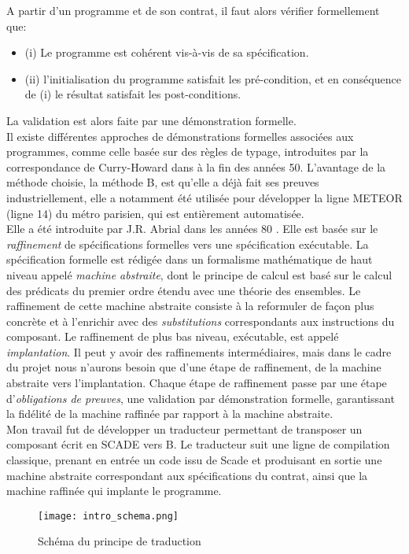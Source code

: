 \noindent
A partir d'un programme et de son contrat, il faut alors vérifier formellement
que: 
\begin{itemize}
\item  (i) Le programme est cohérent vis-à-vis de sa spécification.
\item (ii) l'initialisation du programme satisfait les pré-condition, et en
conséquence de (i) le résultat satisfait les post-conditions.
\end{itemize}
La validation est alors faite par une démonstration formelle.\\

Il existe différentes approches de démonstrations formelles associées aux programmes, comme celle basée
sur des règles de typage, introduites par la correspondance de
Curry-Howard dans à la fin des années 50. 
L'avantage de la méthode choisie, la méthode B, est qu'elle a déjà
fait ses preuves industriellement, elle a notamment été utilisée pour
développer la ligne METEOR (ligne 14) du métro parisien, qui est
entièrement automatisée.\\ 
Elle a été introduite
par J.R. Abrial dans les années 80 \cite{JRA}. Elle est basée sur le \emph{raffinement} de
spécifications formelles vers une spécification exécutable. La spécification
formelle est rédigée dans un formalisme mathématique de haut niveau appelé
\emph{machine abstraite}, dont le principe de calcul est basé sur le calcul
des prédicats du premier ordre étendu avec une théorie des
ensembles. Le raffinement de cette machine abstraite consiste à la
reformuler de façon plus concrète et à l'enrichir avec des
\emph{substitutions} correspondants aux instructions du composant. Le
raffinement de plus bas niveau, exécutable, est appelé \emph{implantation}. Il peut y
avoir des raffinements intermédiaires, mais dans le cadre du projet nous n'aurons besoin que
d'une étape de raffinement, de la machine abstraite vers l'implantation. Chaque
étape de raffinement passe par une étape d'\emph{obligations de preuves}, une
validation par démonstration formelle, garantissant la fidélité de la
machine raffinée par rapport à la machine abstraite. \\

Mon travail fut de développer un traducteur permettant de transposer un
composant écrit en SCADE vers B. Le traducteur suit une ligne de compilation classique, prenant en
entrée un code issu de Scade et produisant en sortie une machine abstraite
correspondant aux spécifications du contrat, ainsi que la machine raffinée qui
implante le programme. \\

\begin{figure}[h]
\begin{center}
\texttt{[image: intro\_schema.png]}
\end{center}
\caption{Schéma du principe de traduction}
\end{figure}
